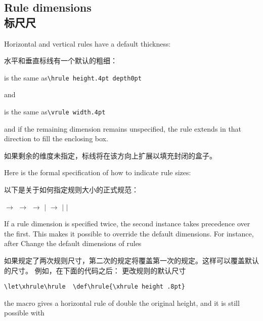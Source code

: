 \subsection{Rule dimensions\\标尺尺}

Horizontal and vertical rules have a default thickness:

水平和垂直标线有一个默认的粗细：
\begin{Disp} \quad is the same as\quad \verb-\hrule height.4pt depth0pt-
\end{Disp}
and 
\begin{Disp} \quad is the same as\quad \verb-\vrule width.4pt- \end{Disp}
and if the remaining dimension remains unspecified, the rule
extends in that direction to fill the enclosing box.

如果剩余的维度未指定，标线将在该方向上扩展以填充封闭的盒子。

Here is the formal specification of how to indicate rule sizes:

以下是关于如何指定规则大小的正式规范：
\begin{disp} $\longrightarrow$ 
                        \nl
      $\longrightarrow$
                        \nl
      $\longrightarrow$
                         \nl \indent$|$
                        \nl
      $\longrightarrow$
                         $|$  $|$
     \end{disp}
If a rule dimension is specified twice, the second instance
takes precedence over the first. This makes it possible
to override the default dimensions. For instance,
after
\alt
\howto Change the default dimensions of rules\par

如果规定了两次规则尺寸，第二次的规定将覆盖第一次的规定。这样可以覆盖默认的尺寸。
例如，在下面的代码之后：
\alt
\howto 更改规则的默认尺寸\par
\begin{verbatim}
\let\xhrule\hrule  \def\hrule{\xhrule height .8pt}
\end{verbatim}
the macro  gives a horizontal rule
of double the original height, and it is still possible
with 

